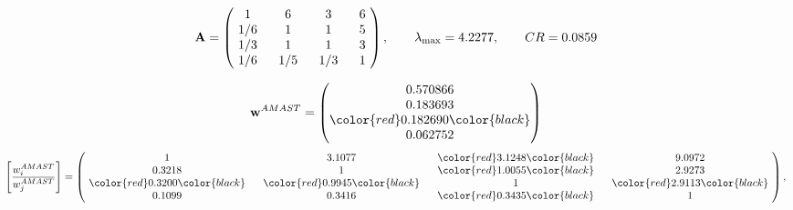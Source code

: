 \begin{example}
\begin{equation*}
\mathbf{A} =
\begin{pmatrix}
$\,\,$ 1 $\,\,$ & $\,\,$6$\,\,$ & $\,\,$3$\,\,$ & $\,\,$6 $\,\,$ \\
$\,\,$ 1/6$\,\,$ & $\,\,$ 1 $\,\,$ & $\,\,$1$\,\,$ & $\,\,$5 $\,\,$ \\
$\,\,$ 1/3$\,\,$ & $\,\,$ 1 $\,\,$ & $\,\,$ 1 $\,\,$ & $\,\,$3 $\,\,$ \\
$\,\,$ 1/6$\,\,$ & $\,\,$ 1/5$\,\,$ & $\,\,$ 1/3$\,\,$ & $\,\,$ 1  $\,\,$ \\
\end{pmatrix},
\qquad
\lambda_{\max} =
4.2277,
\qquad
CR = 0.0859
\end{equation*}

\begin{equation*}
\mathbf{w}^{AMAST} =
\begin{pmatrix}
0.570866\\
0.183693\\
\color{red} 0.182690\color{black} \\
0.062752
\end{pmatrix}\end{equation*}
\begin{equation*}
\left[ \frac{{w}^{AMAST}_i}{{w}^{AMAST}_j} \right] =
\begin{pmatrix}
$\,\,$ 1 $\,\,$ & $\,\,$3.1077$\,\,$ & $\,\,$\color{red} 3.1248\color{black} $\,\,$ & $\,\,$9.0972$\,\,$ \\
$\,\,$0.3218$\,\,$ & $\,\,$ 1 $\,\,$ & $\,\,$\color{red} 1.0055\color{black} $\,\,$ & $\,\,$2.9273  $\,\,$ \\
$\,\,$\color{red} 0.3200\color{black} $\,\,$ & $\,\,$\color{red} 0.9945\color{black} $\,\,$ & $\,\,$ 1 $\,\,$ & $\,\,$\color{red} 2.9113\color{black}  $\,\,$ \\
$\,\,$0.1099$\,\,$ & $\,\,$0.3416$\,\,$ & $\,\,$\color{red} 0.3435\color{black} $\,\,$ & $\,\,$ 1  $\,\,$ \\
\end{pmatrix},
\end{equation*}


\end{example}
